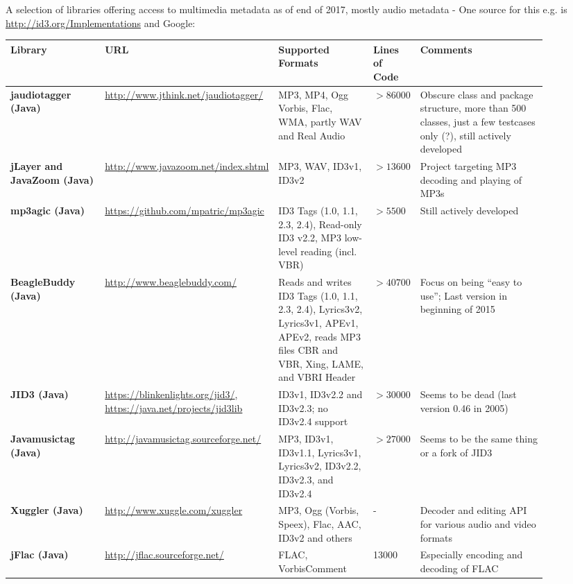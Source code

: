 A selection of libraries offering access to multimedia metadata as of end of 2017, mostly audio metadata - One source for this e.g. is \url{http://id3.org/Implementations} and Google:

\begin{landscape}
\begin{longtable}{|p{0.18\linewidth}|p{0.22\linewidth}|p{0.18\linewidth}|p{0.07\linewidth}|p{0.25\linewidth}|}
	\hline
	\rowcolor[gray]{.9}\textbf{Library} & \textbf{URL} & \textbf{Supported Formats} & \textbf{Lines of Code} & \textbf{Comments} \\
	\endhead
	\hline
\textbf{jaudiotagger (Java)} & \url{http://www.jthink.net/jaudiotagger/} &  MP3, MP4, Ogg Vorbis, Flac, WMA, partly WAV and Real Audio & $>86000$ & Obscure class and package structure, more than 500 classes, just a few testcases only (?), still actively developed \\
	\hline
\textbf{jLayer and JavaZoom (Java)} & \url{http://www.javazoom.net/index.shtml} & MP3, WAV, ID3v1, ID3v2 & $>13600$ & Project targeting MP3 decoding and playing of MP3s \\
	\hline
\textbf{mp3agic (Java)} & \url{https://github.com/mpatric/mp3agic} & ID3 Tags (1.0, 1.1, 2.3, 2.4), Read-only ID3 v2.2, MP3 low-level reading (incl. VBR) & $>5500$ & Still actively developed \\
	\hline
\textbf{BeagleBuddy (Java)} & \url{http://www.beaglebuddy.com/} & Reads and writes ID3 Tags (1.0, 1.1, 2.3, 2.4), Lyrics3v2, Lyrics3v1, APEv1, APEv2, reads MP3 files CBR and VBR, Xing, LAME, and VBRI Header & $>40700$ & Focus on being ``easy to use''; Last version in beginning of 2015 \\
	\hline
\textbf{JID3 (Java)} & \url{https://blinkenlights.org/jid3/}, \url{https://java.net/projects/jid3lib} & ID3v1, ID3v2.2 and ID3v2.3; no ID3v2.4 support & $>30000$ & Seems to be dead (last version 0.46 in 2005) \\
 	\hline
\textbf{Javamusictag (Java)} & \url{http://javamusictag.sourceforge.net/} & MP3, ID3v1, ID3v1.1, Lyrics3v1, Lyrics3v2, ID3v2.2, ID3v2.3, and ID3v2.4 & $>27000$ & Seems to be the same thing or a fork of JID3 \\
 	\hline
\textbf{Xuggler (Java)} & \url{http://www.xuggle.com/xuggler} & MP3, Ogg (Vorbis, Speex), Flac, AAC, ID3v2 and others & - & Decoder and editing API for various audio and video formats \\
	\hline
\textbf{jFlac (Java)} & \url{http://jflac.sourceforge.net/} & FLAC, VorbisComment & 13000 & Especially encoding and decoding of FLAC \\

\end{longtable}
\end{landscape}
